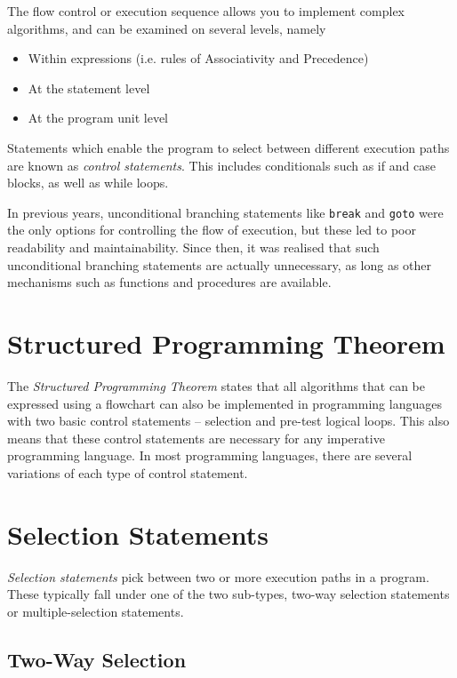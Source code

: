 
The flow control or execution sequence allows you to implement complex algorithms, and can be examined on several levels,
 namely
\begin{itemize}
  \item Within expressions (i.e. rules of Associativity and Precedence)
  \item At the statement level
  \item At the program unit level
\end{itemize}

Statements which enable the program to select between different execution paths are known as \textit{control statements}.
 This includes conditionals such as if and case blocks, as well as while loops.

In previous years, unconditional branching statements like \verb`break` and \verb`goto` were the only options for
 controlling the flow of execution, but these led to poor readability and maintainability. Since then, it was realised
 that such unconditional branching statements are actually unnecessary, as long as other mechanisms such as functions
 and procedures are available.

\section*{Structured Programming Theorem}

The \textit{Structured Programming Theorem} states that all algorithms that can be expressed using a flowchart can also
 be implemented in programming languages with two basic control statements -- selection and pre-test logical loops. This
 also means that these control statements are necessary for any imperative programming language. In most programming
 languages, there are several variations of each type of control statement.

\section*{Selection Statements}

\textit{Selection statements} pick between two or more execution paths in a program. These typically fall under one of
 the two sub-types, two-way selection statements or multiple-selection statements.

\subsection*{Two-Way Selection}

